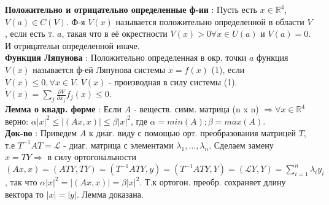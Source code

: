 \documentclass[unicode, 8pt, a4paper,oneside, landscape]{article}
\begin{document}
\begin{multicols}{4}
{\bf Положительно и отрицательно определенные ф-ии} : Пусть есть $x \in \mathbb{R}^4$, $V(a) \in C(V)$. Ф-я $V(x)$ называется положительно определенной в области $V$, если есть т. $a$, такая что в её окрестности $V(x) > 0 \forall x \in U(a)$ и $V(a) = 0$. И отрицательн определенной иначе.\\
{\bf Функция Ляпунова} : Положительно определенная в окр. точки $a$ функция $V(x)$ называется ф-ей Ляпунова системы $\dot{x} = f(x)$ (1), если $\dot{V}(x) \leq 0, \forall x \in V$. $\dot{V}(x)$ - производная в силу системы (1). $\dot{V}(x) = \sum_j \frac{\partial V}{\partial x_j} f_j(x) \leq 0$.\\
{\bf Лемма о квадр. форме} : Если $A$ - веществ. симм. матрица (n x n) $\Rightarrow \forall x \in \mathbb{R}^4$ верно: $\alpha |x|^2 \leq |(Ax, x)| \leq \beta |x|^2$, где $\alpha = min(A); \beta = max(A)$.\\
{\bf Док-во} : Приведем $A$ к диаг. виду с помощью орт. преобразования  матрицей $T$, т.е $T^{-1}AT = \mathcal{L}$ - диаг. матрица с элементами $\lambda_1, \ldots, \lambda_n$. Сделаем замену $x =TY \Rightarrow$ в силу ортогональности $(Ax, x) = (ATY, TY) = (T^{-1}ATY, y) = (T^{-1}ATY, Y) = (\mathcal{L}Y, Y) = \sum_{i=1}^n \lambda_iy_i$, так что $\alpha |x|^2 = |(Ax, x)| = \beta |x|^2$. Т.к ортогон. преобр. сохраняет длину вектора то $|x| = |y|$. Лемма доказана.  




\end{multicols}	
\end{document}
